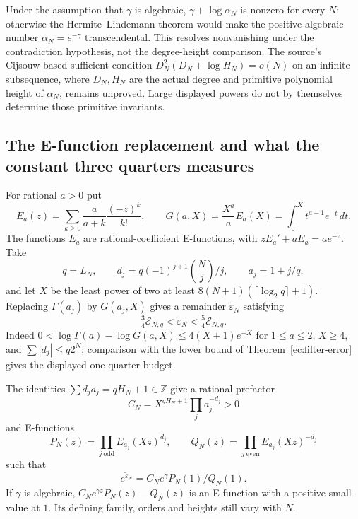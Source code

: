 \documentclass[11pt,a4paper]{article}
\newcommand{\Z}{\mathbb Z}
\theoremstyle{definition}
\theoremstyle{remark}
\numberwithin{equation}{section}
\begin{document}
Under the assumption that $\gamma$ is algebraic,
$\gamma+\log\alpha_N$ is nonzero for every $N$: otherwise the
Hermite--Lindemann theorem would make the positive algebraic number
$\alpha_N=e^{-\gamma}$ transcendental.  This resolves nonvanishing under
the contradiction hypothesis, not the degree-height comparison.  The
source's Cijsouw-based sufficient condition
$D_N^2(D_N+\log H_N)=o(N)$ on an infinite subsequence, where $D_N,H_N$
are the actual degree and primitive polynomial height of $\alpha_N$,
remains unproved.  Large displayed powers do not by themselves determine
those primitive invariants.

\subsection{The E-function replacement and what the constant three quarters measures}
\label{ec:e-replacement}
For rational $a>0$ put
\[
 E_a(z)=\sum_{k\ge0}\frac{a}{a+k}\frac{(-z)^k}{k!},\qquad
 G(a,X)=\frac{X^a}{a}E_a(X)=\int_0^Xt^{a-1}e^{-t}\,dt.
\]
The functions $E_a$ are rational-coefficient E-functions, with
$zE_a'+aE_a=ae^{-z}$.  Take
\[
 q=L_N,\qquad d_j=q(-1)^{j+1}\binom Nj/j,\qquad a_j=1+j/q,
\]
and let $X$ be the least
power of two at least $8(N+1)(\lceil\log_2q\rceil+1)$.  Replacing
$\Gamma(a_j)$ by $G(a_j,X)$ gives a remainder
$\widetilde\varepsilon_N$ satisfying
\[
 \tfrac34\mathcal E_{N,q}<\widetilde\varepsilon_N
 <\tfrac54\mathcal E_{N,q}.
\]
Indeed $0<\log\Gamma(a)-\log G(a,X)\le4(X+1)e^{-X}$ for
$1\le a\le2$, $X\ge4$, and
$\sum|d_j|\le q2^N$; comparison with the lower bound of
Theorem~\ref{ec:filter-error} gives the displayed one-quarter budget.

The identities $\sum d_ja_j=qH_N+1\in\Z$ give a rational prefactor
\[
 C_N=X^{qH_N+1}\prod_j a_j^{-d_j}>0
\]
and E-functions
\[
 P_N(z)=\prod_{j\ \mathrm{odd}}E_{a_j}(Xz)^{d_j},\qquad
 Q_N(z)=\prod_{j\ \mathrm{even}}E_{a_j}(Xz)^{-d_j}
\]
such that
\[
 e^{\widetilde\varepsilon_N}
 =C_Ne^\gamma P_N(1)/Q_N(1).
\]
If $\gamma$ is algebraic, $C_Ne^{\gamma z}P_N(z)-Q_N(z)$ is an
E-function with a positive small value at $1$.  Its defining family,
orders and heights still vary with $N$.
\end{document}

